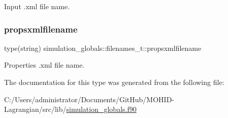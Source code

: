 Input .xml file name. 

\mbox{\label{structsimulation__globals_1_1filenames__t_a7574fc21683b726bc0cc9d41bf8f4513}} 
\subsubsection{\texorpdfstring{propsxmlfilename}{propsxmlfilename}}
{\footnotesize\ttfamily type(string) simulation\+\_\+globals\+::filenames\+\_\+t\+::propsxmlfilename\hspace{0.3cm}{\ttfamily [private]}}



Properties .xml file name. 



The documentation for this type was generated from the following file\+:\begin{DoxyCompactItemize}
\item 
C\+:/\+Users/administrator/\+Documents/\+Git\+Hub/\+M\+O\+H\+I\+D-\/\+Lagrangian/src/lib/\mbox{\hyperlink{simulation__globals_8f90}{simulation\+\_\+globals.\+f90}}\end{DoxyCompactItemize}
